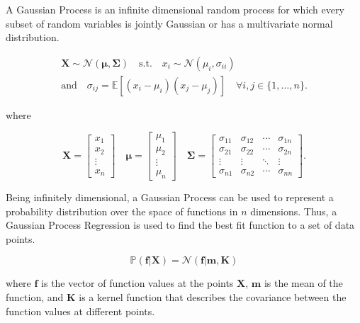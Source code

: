 \documentclass{article}
\newcommand{\Ex}{\mathbb{E}}
\begin{document}
A Gaussian Process is an infinite dimensional random process for which every subset of random variables is jointly Gaussian or has a multivariate normal distribution.

\begin{equation}
\begin{gathered}
    \mathbf{X} \sim \mathcal{N}(\mathbf{\mu}, \mathbf{\Sigma}) \quad \text{s.t.} \quad x_i \sim \mathcal{N}(\mu_i, \sigma_{ii}) \\
    \text{and} \quad  \sigma_{ij} = \Ex[(x_i - \mu_i)(x_j - \mu_j)] \quad \forall i,j \in \{1, \ldots, n\}.
  \end{gathered}
\end{equation}

where

\begin{equation}
\mathbf{X} = \begin{bmatrix}
    x_1    \\
    x_2    \\
    \vdots \\
    x_n
  \end{bmatrix}
  \quad
  \mathbf{\mu} = \begin{bmatrix}
    \mu_1  \\
    \mu_2  \\
    \vdots \\
    \mu_n
  \end{bmatrix}
  \quad
  \mathbf{\Sigma} = \begin{bmatrix}
    \sigma_{11} & \sigma_{12} & \cdots & \sigma_{1n} \\
    \sigma_{21} & \sigma_{22} & \cdots & \sigma_{2n} \\
    \vdots      & \vdots      & \ddots & \vdots      \\
    \sigma_{n1} & \sigma_{n2} & \cdots & \sigma_{nn}
  \end{bmatrix}.
\end{equation}

Being infinitely dimensional, a Gaussian Process can be used to represent a probability distribution over the space of functions in $n$ dimensions. Thus, a Gaussian Process Regression is used to find the best fit function to a set of data points.

\begin{equation}
\mathbb{P}(\mathbf{f} | \mathbf{X}) = \mathcal{N}(\mathbf{f} | \mathbf{m}, \mathbf{K})
\end{equation}

where $\mathbf{f}$ is the vector of function values at the points $\mathbf{X}$, $\mathbf{m}$ is the mean of the function, and $\mathbf{K}$ is a kernel function that describes the covariance between the function values at different points.
\end{document}
